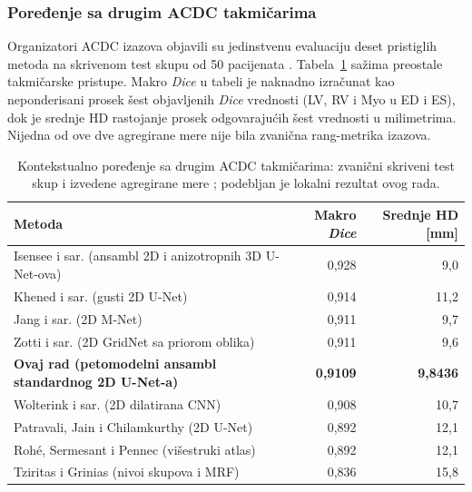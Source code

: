 \documentclass[11pt,a4paper]{article}
\begin{document}
\subsubsection{Poređenje sa drugim ACDC takmičarima}
Organizatori ACDC izazova objavili su jedinstvenu evaluaciju deset pristiglih metoda na skrivenom
test skupu od 50 pacijenata \cite{bernard2018}. Tabela~\ref{tab:contenders} sažima preostale
takmičarske pristupe. Makro \textit{Dice} u tabeli je naknadno izračunat kao neponderisani prosek šest
objavljenih \textit{Dice} vrednosti (LV, RV i Myo u ED i ES), dok je srednje HD rastojanje prosek
odgovarajućih šest vrednosti u milimetrima. Nijedna od ove dve agregirane mere nije bila zvanična
rang-metrika izazova.

\begin{table}[H]
	\centering
	\caption{Kontekstualno poređenje sa drugim ACDC takmičarima: zvanični skriveni test skup i izvedene agregirane mere \cite{bernard2018}; podebljan je lokalni rezultat ovog rada.}
	\label{tab:contenders}
	\small
	\begin{tabularx}{\textwidth}{Xrr}
		\toprule
		Metoda                                                         & Makro \textit{Dice}      & Srednje HD [mm] \\
		\midrule
		Isensee i sar. (ansambl 2D i anizotropnih 3D U-Net-ova)        & 0,928           & 9,0             \\
		Khened i sar. (gusti 2D U-Net)                                 & 0,914           & 11,2            \\
		Jang i sar. (2D M-Net)                                         & 0,911           & 9,7             \\
		Zotti i sar. (2D GridNet sa priorom oblika)                    & 0,911           & 9,6             \\
		\textbf{Ovaj rad (petomodelni ansambl standardnog 2D U-Net-a)} & \textbf{0,9109} & \textbf{9,8436} \\
		Wolterink i sar. (2D dilatirana CNN)                           & 0,908           & 10,7            \\
		Patravali, Jain i Chilamkurthy (2D U-Net)                      & 0,892           & 12,1            \\
		Roh\'e, Sermesant i Pennec (višestruki atlas)                  & 0,892           & 12,1            \\
		Tziritas i Grinias (nivoi skupova i MRF)                       & 0,836           & 15,8            \\
		\bottomrule
	\end{tabularx}
\end{table}
\end{document}
